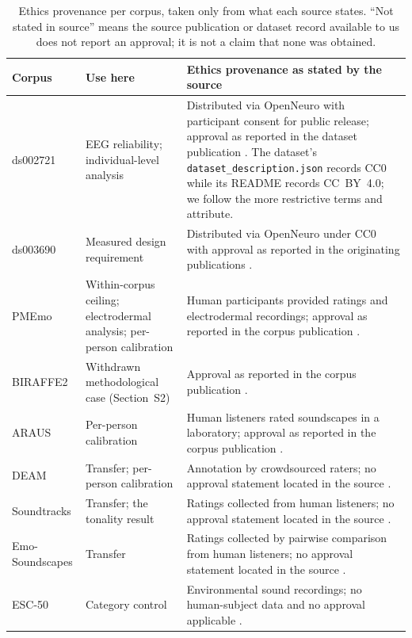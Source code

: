\begin{table}[htbp]
\centering\footnotesize
\caption{Ethics provenance per corpus, taken only from what each source states.
``Not stated in source'' means the source publication or dataset record
available to us does not report an approval; it is not a claim that none was
obtained.}
\label{tab:ethics}
\begin{tabular}{p{2.4cm}p{3.0cm}p{8.2cm}}
\toprule
Corpus & Use here & Ethics provenance as stated by the source \\
\midrule
ds002721 &
EEG reliability; individual-level analysis &
Distributed via OpenNeuro with participant consent for public release;
approval as reported in the dataset publication \cite{daly2018data}. The
dataset's \texttt{dataset\_description.json} records CC0 while its README
records CC~BY~4.0; we follow the more restrictive terms and attribute. \\
\addlinespace
ds003690 &
Measured design requirement &
Distributed via OpenNeuro under CC0 with approval as reported in the
originating publications \cite{ribeiro2019erp, ribeiro2019cardiac}. \\
\addlinespace
PMEmo &
Within-corpus ceiling; electrodermal analysis; per-person calibration &
Human participants provided ratings and electrodermal recordings; approval as
reported in the corpus publication \cite{zhang2018pmemo}. \\
\addlinespace
BIRAFFE2 &
Withdrawn methodological case (Section~S2) &
Approval as reported in the corpus publication \cite{kutt2022}. \\
\addlinespace
ARAUS &
Per-person calibration &
Human listeners rated soundscapes in a laboratory; approval as reported in the
corpus publication \cite{ooi2024araus}. \\
\addlinespace
DEAM &
Transfer; per-person calibration &
Annotation by crowdsourced raters; no approval statement located in the source
\cite{aljanaki2017}. \\
\addlinespace
Soundtracks &
Transfer; the tonality result &
Ratings collected from human listeners; no approval statement located in the
source \cite{eerola2011}. \\
\addlinespace
Emo-Soundscapes &
Transfer &
Ratings collected by pairwise comparison from human listeners; no approval
statement located in the source \cite{fan2017emo}. \\
\addlinespace
ESC-50 &
Category control &
Environmental sound recordings; no human-subject data and no approval
applicable \cite{piczak2015}. \\
\bottomrule
\end{tabular}
\end{table}

